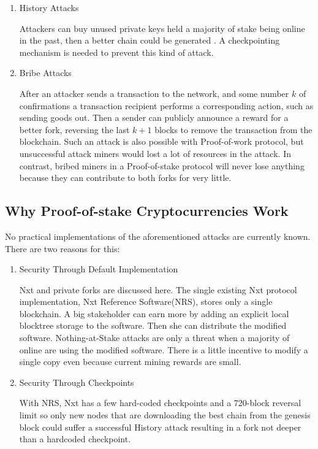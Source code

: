 \documentclass[preprint,review,3p,times,twocolumn]{elsarticle}
\begin{document}
\begin{enumerate}[1.]
\item History Attacks

Attackers can buy unused private keys held a majority of stake being online in the past, then a better chain could be generated \cite{Buterina}. A checkpointing mechanism is needed to prevent this kind of attack.

\item Bribe Attacks

After an attacker sends a transaction to the network, and some number \(k\) of confirmations a transaction recipient performs a corresponding action, such as sending goods out. Then a sender can publicly announce a reward for a better fork, reversing the last \(k+1\) blocks to remove the transaction from the blockchain. Such an attack is also possible with Proof-of-work protocol, but unsuccessful attack miners would lost a lot of resources in the attack. In contrast, bribed miners in a Proof-of-stake protocol will never lose anything because they can contribute to both forks for very little\cite{Bentov2014}.

\end{enumerate}

\subsection{Why Proof-of-stake Cryptocurrencies Work}

No practical implementations of the aforementioned attacks are currently known. There are two reasons for this:

\begin{enumerate}

\item Security Through Default Implementation

Nxt and private forks are discussed here. The single existing Nxt protocol implementation, Nxt Reference Software(NRS), stores only a single blockchain. A big stakeholder can earn more\cite{Andruiman2014} by adding an explicit local blocktree storage to the software. Then she can distribute the modified software. Nothing-at-Stake attacks are only a threat when a majority of online are using the modified software. There is a little incentive to modify a single copy even because current mining rewards are small. 
		
\item Security Through Checkpoints

With NRS, Nxt has a few hard-coded checkpoints and a 720-block reversal limit so only new nodes that are downloading the best chain from the genesis block could suffer a successful History attack resulting in a fork not deeper than a hardcoded checkpoint.

\end{enumerate}
\end{document}
